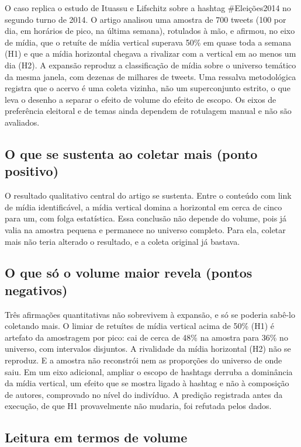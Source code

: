 \documentclass[12pt,a4paper]{article}
\begin{document}
O caso replica o estudo de Ituassu e Lifschitz sobre a hashtag \#Eleições2014 no
segundo turno de 2014. O artigo analisou uma amostra de 700 tweets (100 por dia,
em horários de pico, na última semana), rotulados à mão, e afirmou, no eixo de
mídia, que o retuíte de mídia vertical superava 50\% em quase toda a semana (H1) e
que a mídia horizontal chegava a rivalizar com a vertical em ao menos um dia (H2).
A expansão reproduz a classificação de mídia sobre o universo temático da mesma
janela, com dezenas de milhares de tweets. Uma ressalva metodológica registra que
o acervo é uma coleta vizinha, não um superconjunto estrito, o que leva o desenho
a separar o efeito de volume do efeito de escopo. Os eixos de preferência
eleitoral e de temas ainda dependem de rotulagem manual e não são avaliados.

\subsection{O que se sustenta ao coletar mais (ponto positivo)}

O resultado qualitativo central do artigo se sustenta. Entre o conteúdo com link
de mídia identificável, a mídia vertical domina a horizontal em cerca de cinco
para um, com folga estatística. Essa conclusão não depende do volume, pois já
valia na amostra pequena e permanece no universo completo. Para ela, coletar mais
não teria alterado o resultado, e a coleta original já bastava.

\subsection{O que só o volume maior revela (pontos negativos)}

Três afirmações quantitativas não sobrevivem à expansão, e só se poderia sabê-lo
coletando mais. O limiar de retuítes de mídia vertical acima de 50\% (H1) é
artefato da amostragem por pico: cai de cerca de 48\% na amostra para 36\% no
universo, com intervalos disjuntos. A rivalidade da mídia horizontal (H2) não se
reproduz. E a amostra não reconstrói nem as proporções do universo de onde saiu.
Em um eixo adicional, ampliar o escopo de hashtags derruba a dominância da mídia
vertical, um efeito que se mostra ligado à hashtag e não à composição de autores,
comprovado no nível do indivíduo. A predição registrada antes da execução, de que
H1 provavelmente não mudaria, foi refutada pelos dados.

\subsection{Leitura em termos de volume}
\end{document}
